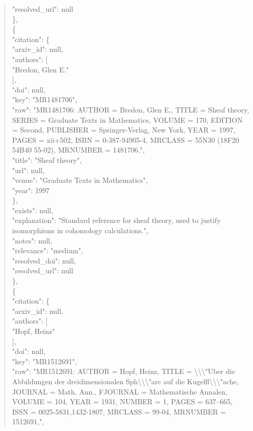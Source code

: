 \documentclass[11pt]{article}
\begin{document}
\begin{quote}
      "resolved\_url": null\\
    \},\\
    \{\\
      "citation": \{\\
        "arxiv\_id": null,\\
        "authors": [\\
          "Bredon, Glen E."\\
        ],\\
        "doi": null,\\
        "key": "MR1481706",\\
        "raw": "MR1481706: AUTHOR = Bredon, Glen E., TITLE = Sheaf theory, SERIES = Graduate Texts in Mathematics, VOLUME = 170, EDITION = Second, PUBLISHER = Springer-Verlag, New York, YEAR = 1997, PAGES = xii+502, ISBN = 0-387-94905-4, MRCLASS = 55N30 (18F20 54B40 55-02), MRNUMBER = 1481706,",\\
        "title": "Sheaf theory",\\
        "url": null,\\
        "venue": "Graduate Texts in Mathematics",\\
        "year": 1997\\
      \},\\
      "exists": null,\\
      "explanation": "Standard reference for sheaf theory, used to justify isomorphisms in cohomology calculations.",\\
      "notes": null,\\
      "relevance": "medium",\\
      "resolved\_doi": null,\\
      "resolved\_url": null\\
    \},\\
    \{\\
      "citation": \{\\
        "arxiv\_id": null,\\
        "authors": [\\
          "Hopf, Heinz"\\
        ],\\
        "doi": null,\\
        "key": "MR1512691",\\
        "raw": "MR1512691: AUTHOR = Hopf, Heinz, TITLE = \textbackslash{}\textbackslash{}\textbackslash{}"Uber die Abbildungen der dreidimensionalen Sph\textbackslash{}\textbackslash{}\textbackslash{}"are auf die Kugelfl\textbackslash{}\textbackslash{}\textbackslash{}"ache, JOURNAL = Math. Ann., FJOURNAL = Mathematische Annalen, VOLUME = 104, YEAR = 1931, NUMBER = 1, PAGES = 637--665, ISSN = 0025-5831,1432-1807, MRCLASS = 99-04, MRNUMBER = 1512691,",\\

\end{quote}
\end{document}
